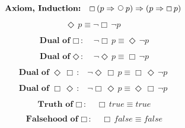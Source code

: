 \documentclass[12pt, fleqn, leqno]{article}
\newcommand{\impl}{\ensuremath{\Rightarrow}}        %
\newcommand{\Next}{\;\,\text{\raisebox{3.5pt}{\circle{6}}}}
\newcommand{\Event}{\Diamond\,}
\newcommand{\Always}{\Box\,}
\newcommand{\spacer}{\vspace{-30pt}}
\begin{document}
\begin{equation}\label{E:induction}
\textbf{Axiom, Induction:}\quad \Always (p \impl \Next p) \impl (p \impl \Always p)
\end{equation}

\spacer

\begin{equation}\label{E:eventAsAlways}
\Event p \equiv \neg\Always\neg p
\end{equation}

\spacer

\begin{equation}\label{E:dualAlways}
\textbf{Dual of $\Always$:}\quad \neg\Always p \equiv \Event\neg p
\end{equation}

\spacer

\begin{equation}\label{E:dualEvent}
\textbf{Dual of $\Event$:}\quad \neg\Event p \equiv \Always\neg p
\end{equation}

\spacer

\begin{equation}\label{E:dualEventAlways}
\textbf{Dual of $\Event \Always$:}\quad \neg \Event\Always p \equiv \Always\Event \neg p
\end{equation}

\spacer

\begin{equation}\label{E:dualAlwaysEvent}
\textbf{Dual of $\Always \Event$:}\quad \neg \Always\Event p \equiv \Event \Always\neg p
\end{equation}

\spacer

\begin{equation}\label{E:alwaysTrue}
\textbf{Truth of $\Always$:}\quad \Always true \equiv true
\end{equation}

\spacer

\begin{equation}\label{E:alwaysFalse}
\textbf{Falsehood of $\Always$:}\quad \Always false \equiv false
\end{equation}
\end{document}
